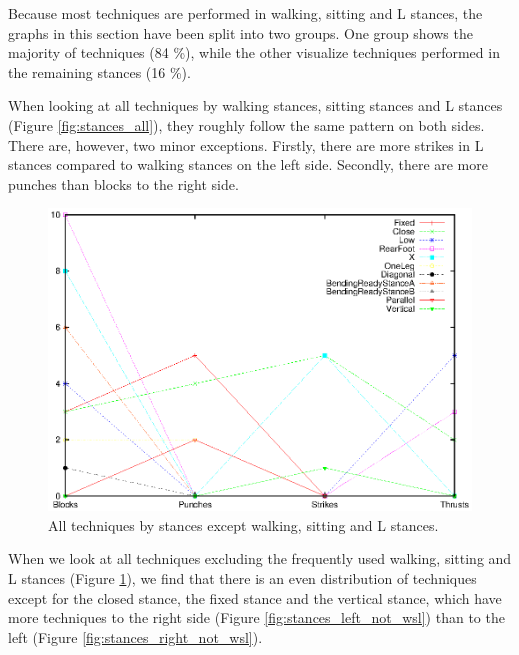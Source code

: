 \documentclass[10pt,twocolumn,a4paper]{article}
\begin{document}
  Because most techniques are performed in walking, sitting and L stances, the
  graphs in this section have been split into two groups. One group shows the
  majority of techniques (84 \%), while the other visualize techniques
  performed in the remaining stances (16 \%).

  When looking at all techniques by walking stances, sitting stances and L
  stances (Figure \ref{fig:stances_all}), they roughly follow the same pattern
  on both sides. There are, however, two minor exceptions. Firstly, there are
  more strikes in L stances compared to walking stances on the left side.
  Secondly, there are more punches than blocks to the right side.

  \begin{figure}
    \includegraphics[scale=0.72]{data/gnuplot/eps/stances_not_wsl}
    \caption{All techniques by stances except walking, sitting and L stances.}
    \label{fig:stances_not_wsl}
  \end{figure}

  When we look at all techniques excluding the frequently used walking,
  sitting and L stances (Figure \ref{fig:stances_not_wsl}), we find that there
  is an even distribution of techniques except for the closed stance, the
  fixed stance and the vertical stance, which have more techniques to the
  right side (Figure \ref{fig:stances_left_not_wsl}) than to the left (Figure
  \ref{fig:stances_right_not_wsl}).
\end{document}
